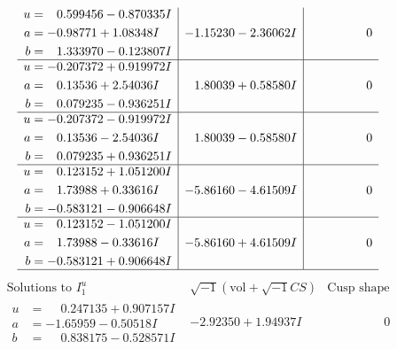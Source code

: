\documentclass[1p]{elsarticle_modified}
\theoremstyle{definition}
\newcommand{\I}{\sqrt{-1}}
\begin{document}
$$\begin{array}{c|c|c}
\begin{aligned}
u &= \phantom{-}0.599456 - 0.870335 I \\
a &= -0.98771 + 1.08348 I \\
b &= \phantom{-}1.333970 - 0.123807 I\end{aligned}
 & -1.15230 - 2.36062 I & \phantom{-0.000000 } 0 \\ \hline\begin{aligned}
u &= -0.207372 + 0.919972 I \\
a &= \phantom{-}0.13536 + 2.54036 I \\
b &= \phantom{-}0.079235 - 0.936251 I\end{aligned}
 & \phantom{-}1.80039 + 0.58580 I & \phantom{-0.000000 } 0 \\ \hline\begin{aligned}
u &= -0.207372 - 0.919972 I \\
a &= \phantom{-}0.13536 - 2.54036 I \\
b &= \phantom{-}0.079235 + 0.936251 I\end{aligned}
 & \phantom{-}1.80039 - 0.58580 I & \phantom{-0.000000 } 0 \\ \hline\begin{aligned}
u &= \phantom{-}0.123152 + 1.051200 I \\
a &= \phantom{-}1.73988 + 0.33616 I \\
b &= -0.583121 - 0.906648 I\end{aligned}
 & -5.86160 - 4.61509 I & \phantom{-0.000000 } 0 \\ \hline\begin{aligned}
u &= \phantom{-}0.123152 - 1.051200 I \\
a &= \phantom{-}1.73988 - 0.33616 I \\
b &= -0.583121 + 0.906648 I\end{aligned}
 & -5.86160 + 4.61509 I & \phantom{-0.000000 } 0\\
 \hline 
 \end{array}$$\newpage$$\begin{array}{c|c|c}  
\text{Solutions to }I^u_{1}& \I (\text{vol} + \sqrt{-1}CS) & \text{Cusp shape}\\
 \hline 
\begin{aligned}
u &= \phantom{-}0.247135 + 0.907157 I \\
a &= -1.65959 - 0.50518 I \\
b &= \phantom{-}0.838175 - 0.528571 I\end{aligned}
 & -2.92350 + 1.94937 I & \phantom{-0.000000 } 0 \\ \hline\begin{aligned}

\end{aligned}
\end{array}$$
\end{document}

